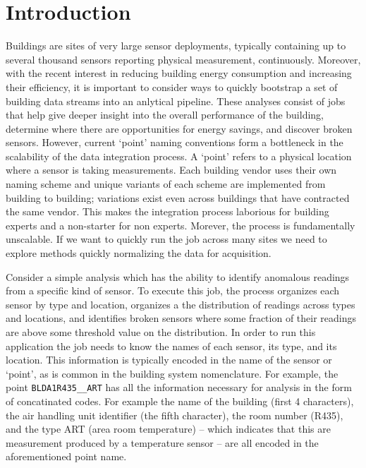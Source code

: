 \section{Introduction}

Buildings are sites of very large sensor deployments, typically containing
up to several thousand sensors reporting physical measurement, continuously.
Moreover, with the recent interest in reducing building energy consumption and
increasing their efficiency, it
is important to consider ways to quickly bootstrap a set of building data streams
into an anlytical pipeline.  These analyses consist of jobs that help give deeper
insight into the overall performance of the building, 
determine where there are opportunities for energy savings, and 
discover broken sensors.
However, current `point' naming conventions form a bottleneck in the scalability of
the data integration process.  A `point' refers to a physical location where
a sensor is taking measurements. Each building vendor uses their own naming scheme and
unique variants of each scheme are implemented from building to building; variations exist
even across buildings that have contracted the same vendor.
This makes the integration process laborious for building experts and a non-starter for 
non experts.  Morever, the process is fundamentally unscalable. 
If we want to quickly run the job across many sites we need
to explore methods quickly normalizing the data for acquisition.

Consider a simple analysis which has the ability
to identify anomalous readings from a specific kind of sensor. To execute this job, 
the process organizes each sensor by type and location, organizes a the distribution of
readings across types and locations, and identifies broken sensors where some fraction of
their readings are above some threshold value on the distribution.
In order to run this application
the job needs to know the names of each sensor, its type, and its location.  
This information is typically encoded in the name of the sensor or `point', as is
common in the building system nomenclature.  For example, the point
\texttt{BLDA1R435__ART} has all the information necessary for analysis in the form of 
concatinated codes.  For example the name of
the building (first 4 characters), the air handling unit identifier (the fifth character),
the room number (R435), and the type ART (area room temperature) -- which indicates that
this are measurement produced by a temperature sensor -- are all encoded in the 
aforementioned point name.

